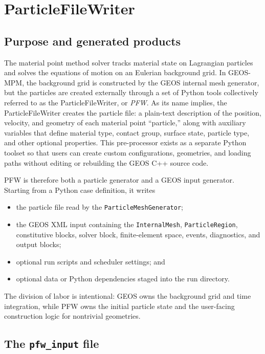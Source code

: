 \chapter{ParticleFileWriter}
\label{chap:pfw}
\label{ch:pfw}

\section{Purpose and generated products}
\label{sec:pfw-purpose}

The material point method solver tracks material state on Lagrangian particles and solves the equations of motion on an Eulerian background grid.  In GEOS-MPM, the background grid is constructed by the GEOS internal mesh generator, but the particles are created externally through a set of Python tools collectively referred to as the ParticleFileWriter, or \emph{PFW}.  As its name implies, the ParticleFileWriter creates the particle file: a plain-text description of the position, velocity, and geometry of each material point ``particle,'' along with auxiliary variables that define material type, contact group, surface state, particle type, and other optional properties.  This pre-processor exists as a separate Python toolset so that users can create custom configurations, geometries, and loading paths without editing or rebuilding the GEOS C++ source code.

PFW is therefore both a particle generator and a GEOS input generator.  Starting from a Python case definition, it writes
\begin{itemize}[leftmargin=*]
\item the particle file read by the \texttt{ParticleMeshGenerator};
\item the GEOS XML input containing the \texttt{InternalMesh}, \texttt{ParticleRegion}, constitutive blocks, solver block, finite-element space, events, diagnostics, and output blocks;
\item optional run scripts and scheduler settings; and
\item optional data or Python dependencies staged into the run directory.
\end{itemize}
The division of labor is intentional: GEOS owns the background grid and time integration, while PFW owns the initial particle state and the user-facing construction logic for nontrivial geometries.

\section{The \texttt{pfw\_input} file}
\label{sec:pfw-input}

